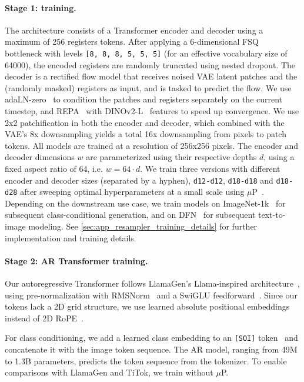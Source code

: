 \paragraph{Stage 1: \ours training.}
The \ours architecture consists of a Transformer encoder and decoder using a maximum of 256 registers tokens. After applying a 6-dimensional FSQ~\cite{mentzer2023fsq} bottleneck with levels \texttt{[8, 8, 8, 5, 5, 5]} (for an effective vocabulary size of \num{64000}), the encoded registers are randomly truncated using nested dropout. The decoder is a rectified flow model that receives noised VAE latent patches and the (randomly masked) registers as input, and is tasked to predict the flow. We use adaLN-zero~\cite{peebles2023scalable} to condition the patches and registers separately on the current timestep, and REPA~\cite{Yu2024REPA} with DINOv2-L~\cite{Oquab2023DINOv2} features to speed up convergence. We use 2x2 patchification in both the \ours encoder and decoder, which combined with the VAE's 8x downsampling yields a total 16x downsampling from pixels to patch tokens. All models are trained at a resolution of 256x256 pixels. The encoder and decoder dimensions $w$ are parameterized using their respective depths $d$, using a fixed aspect ratio of 64, i.e. $w = 64 \cdot d$. We train three \ours versions with different encoder and decoder sizes (separated by a hyphen), \texttt{d12-d12}, \texttt{d18-d18} and \texttt{d18-d28} after sweeping optimal hyperparameters at a small scale using $\mu$P~\cite{Yang2022muP}. Depending on the downstream use case, we train \ours models on ImageNet-1k~\cite{Russakovsky2014ImageNet} for subsequent class-conditional generation, and on DFN~\cite{dfn_dataset} for subsequent text-to-image modeling. See \cref{sec:app_resampler_training_details} for further \ours implementation and training details.

\paragraph{Stage 2: AR Transformer training.}
Our autoregressive Transformer follows LlamaGen's Llama-inspired architecture~\cite{sun2024autoregressive,touvron2023llama}, using pre-normalization with RMSNorm~\cite{zhang2019rmsnorm} and a SwiGLU feedforward~\cite{Shazeer2020GLU}. Since our tokens lack a 2D grid structure, we use learned absolute positional embeddings instead of 2D RoPE~\cite{su2024roformer}. 

For class conditioning, we add a learned class embedding to an \texttt{[SOI]} token~\cite{tian2024var} and concatenate it with the image token sequence. The AR model, ranging from 49M to 1.3B parameters, predicts the token sequence from the \ours tokenizer. To enable comparisons with LlamaGen and TiTok, we train without $\mu$P.


